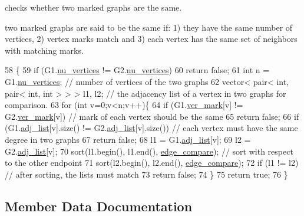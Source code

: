 checks whether two marked graphs are the same. 

two marked graphs are said to be the same if\+: 1) they have the same number of vertices, 2) vertex marks match and 3) each vertex has the same set of neighbors with matching marks. 
\begin{DoxyCode}
58 \{
59   \textcolor{keywordflow}{if} (G1.\hyperlink{classmarked__graph_acf79c6aeb8f32614cb14a5baaa6c9f9b}{nu\_vertices} != G2.\hyperlink{classmarked__graph_acf79c6aeb8f32614cb14a5baaa6c9f9b}{nu\_vertices})
60     \textcolor{keywordflow}{return} \textcolor{keyword}{false};
61   \textcolor{keywordtype}{int} n = G1.\hyperlink{classmarked__graph_acf79c6aeb8f32614cb14a5baaa6c9f9b}{nu\_vertices}; \textcolor{comment}{// number of vertices of the two graphs}
62   vector< pair< int, pair< int, int > > > l1, l2; \textcolor{comment}{// the adjacency list of a vertex in two graphs for
       comparison. }
63   \textcolor{keywordflow}{for} (\textcolor{keywordtype}{int} v=0;v<n;v++)\{
64     \textcolor{keywordflow}{if} (G1.\hyperlink{classmarked__graph_ac83e9377dd4d8bb95be1ac949b127296}{ver\_mark}[v] != G2.\hyperlink{classmarked__graph_ac83e9377dd4d8bb95be1ac949b127296}{ver\_mark}[v]) \textcolor{comment}{// mark of each vertex should be the same}
65       \textcolor{keywordflow}{return} \textcolor{keyword}{false};
66     \textcolor{keywordflow}{if} (G1.\hyperlink{classmarked__graph_a1a0bf7ca413a278763f7c878b3b6fd6f}{adj\_list}[v].size() != G2.\hyperlink{classmarked__graph_a1a0bf7ca413a278763f7c878b3b6fd6f}{adj\_list}[v].size()) \textcolor{comment}{// each vertex must have the same
       degree in two graphs}
67       \textcolor{keywordflow}{return} \textcolor{keyword}{false};
68     l1 = G1.\hyperlink{classmarked__graph_a1a0bf7ca413a278763f7c878b3b6fd6f}{adj\_list}[v];
69     l2 = G2.\hyperlink{classmarked__graph_a1a0bf7ca413a278763f7c878b3b6fd6f}{adj\_list}[v];
70     sort(l1.begin(), l1.end(), \hyperlink{marked__graph_8cpp_a09dd24caed50b1d106e10538e688b6ac}{edge\_compare}); \textcolor{comment}{// sort with respect to the other endpoint}
71     sort(l2.begin(), l2.end(), \hyperlink{marked__graph_8cpp_a09dd24caed50b1d106e10538e688b6ac}{edge\_compare});
72     \textcolor{keywordflow}{if} (l1 != l2) \textcolor{comment}{// after sorting, the lists must match}
73       \textcolor{keywordflow}{return} \textcolor{keyword}{false};
74   \}
75   \textcolor{keywordflow}{return} \textcolor{keyword}{true};
76 \}
\end{DoxyCode}


\subsection{Member Data Documentation}
\mbox{\label{classmarked__graph_a1a0bf7ca413a278763f7c878b3b6fd6f}} 
